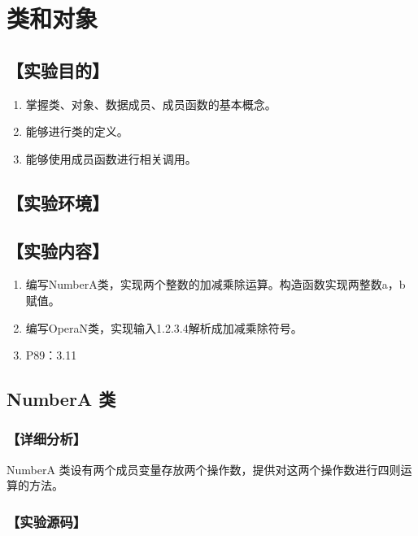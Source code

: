 \section{类和对象}
\hfill{}
\subsection*{【实验目的】}
\begin{enumerate}[topsep=0pt,partopsep=0pt,itemsep=0pt,parsep=0pt,label={\arabic*、}]
\item 掌握类、对象、数据成员、成员函数的基本概念。
\item 能够进行类的定义。
\item 能够使用成员函数进行相关调用。
\end{enumerate}
\subsection*{【实验环境】}
\MyEnvironment
\subsection*{【实验内容】}
\begin{enumerate}[topsep=0pt,partopsep=0pt,itemsep=0pt,parsep=0pt,label={\arabic*、}]
\item 编写NumberA类，实现两个整数的加减乘除运算。构造函数实现两整数a，b赋值。
\item 编写OperaN类，实现输入1.2.3.4解析成加减乘除符号。
\item P89：3.11
\end{enumerate}

\subsection{NumberA 类}
\subsubsection*{【详细分析】}
NumberA 类设有两个成员变量存放两个操作数，提供对这两个操作数进行四则运算的方法。
\subsubsection*{【实验源码】}
{\linespread{1}}
